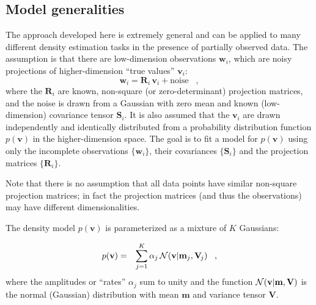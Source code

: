 \documentclass[12pt,preprint]{aastex}
\newcommand{\normal}{{\cal N}}
\renewcommand{\vec}[1]{\mathbf{#1}} %
\newcommand{\mm}{\vec{m}}
\newcommand{\vv}{\vec{v}}
\newcommand{\ww}{\vec{w}}
\newcommand{\mmj}{\mm_j}
\newcommand{\vvi}{\vv_i}
\newcommand{\wwi}{\ww_i}
\newcommand{\ten}[1]{\mathbf{#1}} %
\newcommand{\RR}{\ten{R}}
\renewcommand{\SS}{\ten{S}}
\newcommand{\VV}{\ten{V}}
\newcommand{\RRi}{\RR_i}
\newcommand{\SSi}{\SS_i}
\newcommand{\VVj}{\VV_{\!j}} %
\newcommand{\alphaj}{\alpha_j}
\begin{document}
\subsection{Model generalities}

The approach developed here is extremely general and can be applied to
many different density estimation tasks in the presence of partially
observed data.  The assumption is that there are low-dimension
observations $\wwi$, which are noisy projections of higher-dimension
``true values'' $\vvi$:
\begin{equation}
\wwi=\RRi\,\vvi + \mathrm{noise} \;\;\;,
\end{equation}
where the $\RRi$ are known, non-square (or zero-determinant) projection
matrices, and the noise is drawn from a Gaussian with zero mean and
known (low-dimension) covariance tensor $\SSi$.  It is also assumed
that the $\vvi$ are drawn independently and identically distributed
from a probability distribution function $p(\vv)$ in the
higher-dimension space. The goal is to fit a model for $p(\vv)$
using only the incomplete observations $\{\wwi\}$, their 
covariances $\{\SSi\}$ and the projection matrices $\{\RRi\}$.

Note that there is no assumption that all data points have similar
non-square projection matrices; in fact the projection matrices 
(and thus the observations) may have different dimensionalities.

The density model $p(\vv)$ is parameterized as a mixture of $K$
Gaussians:

\begin{eqnarray}\displaystyle
  p(\vv) &=& \sum_{j=1}^K \alphaj\,\normal(\vv|\mmj,\VVj) \;\;\;,
\end{eqnarray}
where the amplitudes or ``rates'' $\alphaj$ sum to unity
and the function $\normal(\vv|\mm,\VV)$ is the normal (Gaussian)
distribution with mean $\mm$ and variance tensor $\VV$.
\end{document}
